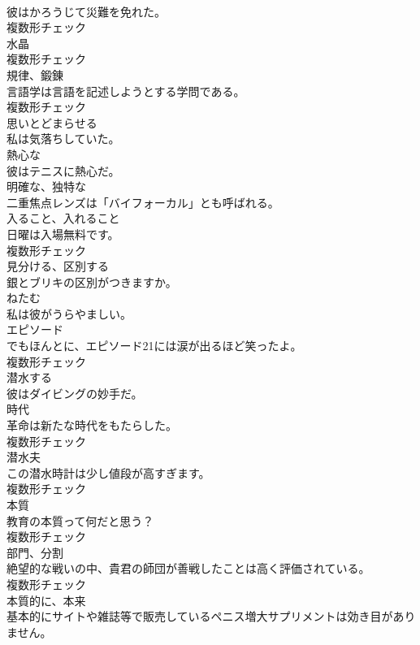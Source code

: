 \documentclass[8pt]{extreport}
\begin{document}
\begin{CJK}{UTF8}{min}
\\	彼はかろうじて災難を免れた。	
\\	複数形チェック
\\	[名詞]	水晶	
\\	複数形チェック
\\	[名詞]	規律、鍛錬	
\\	言語学は言語を記述しようとする学問である。	
\\	複数形チェック
\\	[動詞]	思いとどまらせる	
\\	私は気落ちしていた。	
\\	[形容詞]	熱心な	
\\	彼はテニスに熱心だ。	
\\	[形容詞]	明確な、独特な	
\\	二重焦点レンズは「バイフォーカル」とも呼ばれる。	
\\	[名詞]	入ること、入れること	
\\	日曜は入場無料です。	
\\	複数形チェック
\\	[動詞]	見分ける、区別する	
\\	銀とブリキの区別がつきますか。	
\\	[動詞]	ねたむ	
\\	私は彼がうらやましい。	
\\	[名詞]	エピソード	
\\	でもほんとに、エピソード21には涙が出るほど笑ったよ。	
\\	複数形チェック
\\	[動詞]	潜水する	
\\	彼はダイビングの妙手だ。	
\\	[名詞]	時代	
\\	革命は新たな時代をもたらした。	
\\	複数形チェック
\\	[名詞]	潜水夫	
\\	この潜水時計は少し値段が高すぎます。	
\\	複数形チェック
\\	[名詞]	本質	
\\	教育の本質って何だと思う？	
\\	複数形チェック
\\	[名詞]	部門、分割	
\\	絶望的な戦いの中、貴君の師団が善戦したことは高く評価されている。	
\\	複数形チェック
\\	[副詞]	本質的に、本来	
\\	基本的にサイトや雑誌等で販売しているペニス増大サプリメントは効き目がありません。	

\end{CJK}
\end{document}
